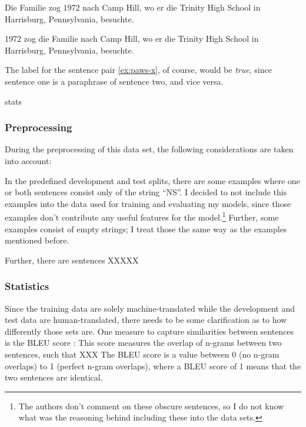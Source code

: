 \begin{examples}
	\label{ex:paws-x}
	\item Die Familie zog 1972 nach Camp Hill, wo er die Trinity High School in Harrisburg, Pennsylvania, besuchte.
		
	1972 zog die Familie nach Camp Hill, wo er die Trinity High School in Harrisburg, Pennsylvania, besuchte.
\end{examples}

The label for the sentence pair \ref{ex:paws-x}, of course, would be \emph{true}, since sentence one is a paraphrase of sentence two, and vice versa.


stats

\subsubsection{Preprocessing}

During the preprocessing of this data set, the following considerations are taken into account:

In the predefined development and test splits, there are some examples where one or both sentences consist
only of the string ``NS''.
I decided to not include this examples into the data used for training and evaluating my models, since
those examples don't contribute any useful features for the model.\footnote{The authors don't comment on these obscure sentences, so I do not know what was the reasoning behind including these into the data sets.}
Further, some examples consist of empty strings; I treat those the same way as the examples mentioned before.

Further, there are sentences XXXXX

\subsubsection{Statistics}

Since the training data are solely machine-translated while the development and test data are human-translated, there needs to be some clarification as to how differently those sets are.
One measure to capture similarities between sentences is the BLEU score \cite{papineni2002bleu}:
This score measures the overlap of n-grams between two sentences, such that XXX
The BLEU score is a value between 0 (no n-gram overlaps) to 1 (perfect n-gram overlaps), where a BLEU score of 1 means that the two sentences are identical.

